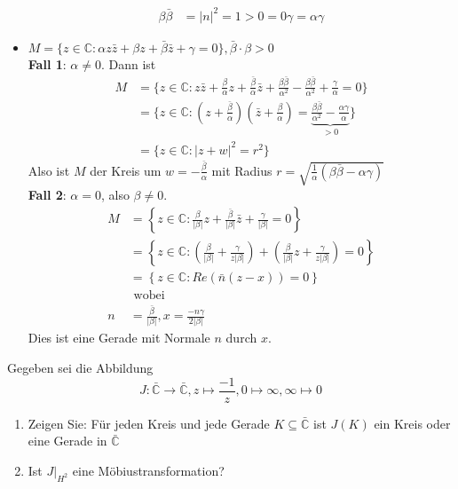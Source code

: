 \begin{solution}
\begin{itemize}
\begin{align*}
      \beta \bar{\beta} &= \vert n \vert^2 = 1 > 0 = 0 \gamma = \alpha \gamma
    \end{align*} 
    \item \( M = \{ z \in \mathbb{C} : \alpha z \bar{z} + \beta z + \bar{\beta} \bar{z} + \gamma = 0 \}, \bar{\beta} \cdot \beta > 0 \) \\
    \textbf{Fall 1}: \( \alpha \neq 0 \). Dann ist
    \begin{align*}
      M &= \{ z \in \mathbb{C} : z \bar{z} + \frac{\beta}{\alpha}z + \frac{\bar{\beta}}{\alpha} \bar{z} + \frac{\beta \bar{\beta}}{\alpha^2} - \frac{\beta \bar{\beta}}{\alpha^2} + \frac{\gamma}{\alpha} = 0\} \\
      &= \{ z \in \mathbb{C} : (z + \frac{\bar{\beta}}{\alpha})(\bar{z} + \frac{\beta}{\alpha}) = \underbrace{\frac{\beta \bar{\beta}}{\alpha^2} - \frac{\alpha \gamma}{\alpha}}_{> 0} \} \\
      &= \{ z \in \mathbb{C} : \vert z + w \vert^2 = r^2\}
    \end{align*}
    Also ist \( M \) der Kreis um \( w = -\frac{\bar{\beta}}{\alpha} \) mit Radius \( r = \sqrt{ \frac{1}{\alpha} (\beta \bar{\beta} - \alpha \gamma)} \) \\
    \textbf{Fall 2}: \( \alpha = 0 \), also \( \beta \neq 0 \). \\
    \begin{align*}
      M &= \left \{ z \in \mathbb{C} : \frac{\beta}{\vert \beta \vert} z + \frac{\bar{\beta}}{\vert \beta \vert} \bar{z} + \frac{\gamma}{\vert \beta \vert} = 0 \right \} \\
      &= \left \{ z \in \mathbb{C} : \left(\frac{\beta}{\vert \beta \vert} + \frac{\gamma}{z\vert \beta \vert} \right) + \left(\frac{\beta}{\vert \beta \vert}z + \frac{\gamma}{z\vert \beta \vert} \right)= 0 \right \} \\
      &= \left \{ z \in \mathbb{C} : Re(\bar{n}(z-x)) = 0 \right \} \\
      &\text{ wobei} \\
      n &= \frac{\bar{\beta}}{\vert \beta \vert}, x = \frac{-n \gamma}{2\vert \beta \vert} 
    \end{align*}
    Dies ist eine Gerade mit Normale \( n \) durch \( x \).
  \end{itemize}
\end{solution}
\begin{assignment}
  Gegeben sei die Abbildung
  \begin{equation*}
    J: \bar{\mathbb{C}} \to \bar{\mathbb{C}}, z \mapsto \frac{-1}{z}, 0 \mapsto \infty, \infty \mapsto 0
  \end{equation*}
  \begin{enumerate}[label= (\alph*)] 
    \item Zeigen Sie: Für jeden Kreis und jede Gerade \( K \subseteq \bar{\mathbb{C}} \) ist \( J(K) \) ein Kreis oder eine Gerade in \( \bar{\mathbb{C}} \)
    \item Ist \( J\bigg\rvert_{ H^2 } \) eine Möbiustransformation?
  \end{enumerate}
\end{assignment}
